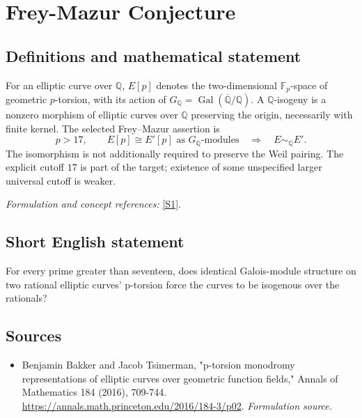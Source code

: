 \documentclass[11pt]{article}
\begin{document}
\section*{\texorpdfstring{Frey-Mazur Conjecture}{Frey-Mazur Conjecture}}\label{284}
\subsection{Definitions and mathematical statement}
For an elliptic curve over ${\mathbb{Q}}$, $E[p]$ denotes the two-dimensional ${\mathbb{F}}_p$-space of geometric $p$-torsion, with its action of $G_{{\mathbb{Q}}}=\operatorname{Gal}(\overline{{\mathbb{Q}}}/{\mathbb{Q}})$. A ${\mathbb{Q}}$-isogeny is a nonzero morphism of elliptic curves over ${\mathbb{Q}}$ preserving the origin, necessarily with finite kernel. The selected Frey--Mazur assertion is
\[
 p>17,\qquad E[p]\cong E'[p]\text{ as }G_{{\mathbb{Q}}}\text{-modules}
 \quad\Longrightarrow\quad E\sim_{{\mathbb{Q}}}E'.
\]
The isomorphism is not additionally required to preserve the Weil pairing. The explicit cutoff $17$ is part of the target; existence of some unspecified larger universal cutoff is weaker.
\par\smallskip\textit{Formulation and concept references:} \href{https://annals.math.princeton.edu/2016/184-3/p02}{[S1]}.

\subsection{Short English statement}
For every prime greater than seventeen, does identical Galois-module structure on two rational elliptic curves' p-torsion force the curves to be isogenous over the rationals?
\subsection{Sources}
\begin{itemize}
\item[S1]Benjamin Bakker and Jacob Tsimerman, "p-torsion monodromy representations of elliptic curves over geometric function fields," Annals of Mathematics 184 (2016), 709-744.
\url{https://annals.math.princeton.edu/2016/184-3/p02}.
\textit{Formulation source.}
\end{itemize}
\end{document}
